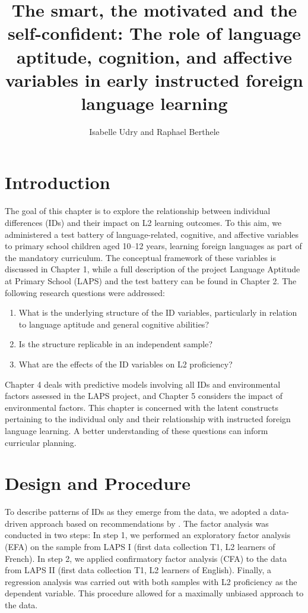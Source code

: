 \documentclass[output=paper]{langsci/langscibook}
\author{Isabelle Udry\orcid{}\affiliation{University of Fribourg, Institut de Plurilinguisme; Zurich University of Teacher Education} and Raphael Berthele\orcid{}\affiliation{University of Fribourg, Institut de Plurilinguisme}}
\title[The smart, the motivated and the self-confident]
      {The smart, the motivated and the self-confident: The role of language aptitude, cognition, and affective variables in early instructed foreign language learning}
\begin{document}
\maketitle 

\section{Introduction}

The goal of this chapter is to explore the relationship between individual differences (IDs) and their impact on L2 learning outcomes. To this aim, we administered a test battery of language-related, cognitive, and affective variables to primary school children aged 10--12 years, learning foreign languages as part of the mandatory curriculum. The conceptual framework of these variables is discussed in Chapter 1, while a full description of the project Language Aptitude at Primary School (LAPS) and the test battery can be found in Chapter 2. The following research questions were addressed:

\begin{enumerate}
\item  What is the underlying structure of the ID variables, particularly in relation to language aptitude and general cognitive abilities?
\item  Is the structure replicable in an independent sample?
\item  What are the effects of the ID variables on L2 proficiency?
\end{enumerate}

Chapter 4 deals with predictive models involving all IDs and environmental factors assessed in the LAPS project, and Chapter 5 considers the impact of environmental factors. This chapter is concerned with the latent constructs pertaining to the individual only and their relationship with instructed foreign language learning. A better understanding of these questions can inform curricular planning. 

\section{Design and Procedure}\largerpage %

To describe patterns of IDs as they emerge from the data, we adopted a data-driven approach based on recommendations by \citet{Brown2006}. The factor analysis was conducted in two steps: In step 1, we performed an exploratory factor analysis (EFA) on the sample from LAPS I (first data collection T1, L2 learners of French). In step 2, we applied confirmatory factor analysis (CFA) to the data from LAPS II (first data collection T1, L2 learners of English). Finally, a regression analysis was carried out with both samples with L2 proficiency as the dependent variable. This procedure allowed for a maximally unbiased approach to the data. 
\end{document}
